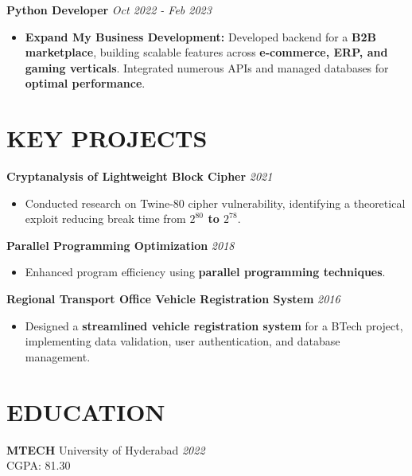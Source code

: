 \documentclass[10pt,a4paper]{article}
\begin{document}
\vspace{2mm}
\textbf{Python Developer} \hfill \textit{Oct 2022 - Feb 2023}
\begin{itemize}[leftmargin=*, itemsep=0pt, topsep=2pt, parsep=0pt]
    \item \textbf{Expand My Business Development:} Developed backend for a \textbf{B2B marketplace}, building scalable features across \textbf{e-commerce, ERP, and gaming verticals}. Integrated numerous APIs and managed databases for \textbf{optimal performance}.
\end{itemize}

\section*{KEY PROJECTS}

\textbf{Cryptanalysis of Lightweight Block Cipher} \hfill \textit{2021}
\begin{itemize}[leftmargin=*, itemsep=0pt, topsep=2pt, parsep=0pt]
    \item Conducted research on Twine-80 cipher vulnerability, identifying a theoretical exploit reducing break time from \textbf{$2^{80}$ to $2^{78}$}.
\end{itemize}

\textbf{Parallel Programming Optimization} \hfill \textit{2018}
\begin{itemize}[leftmargin=*, itemsep=0pt, topsep=2pt, parsep=0pt]
    \item Enhanced program efficiency using \textbf{parallel programming techniques}.
\end{itemize}

\textbf{Regional Transport Office Vehicle Registration System} \hfill \textit{2016}
\begin{itemize}[leftmargin=*, itemsep=0pt, topsep=2pt, parsep=0pt]
    \item Designed a \textbf{streamlined vehicle registration system} for a BTech project, implementing data validation, user authentication, and database management.
\end{itemize}

\section*{EDUCATION}
\textbf{MTECH} \hfill University of Hyderabad \hfill \textit{2022} \\
CGPA: 81.30
\vspace{2mm}
\end{document}
